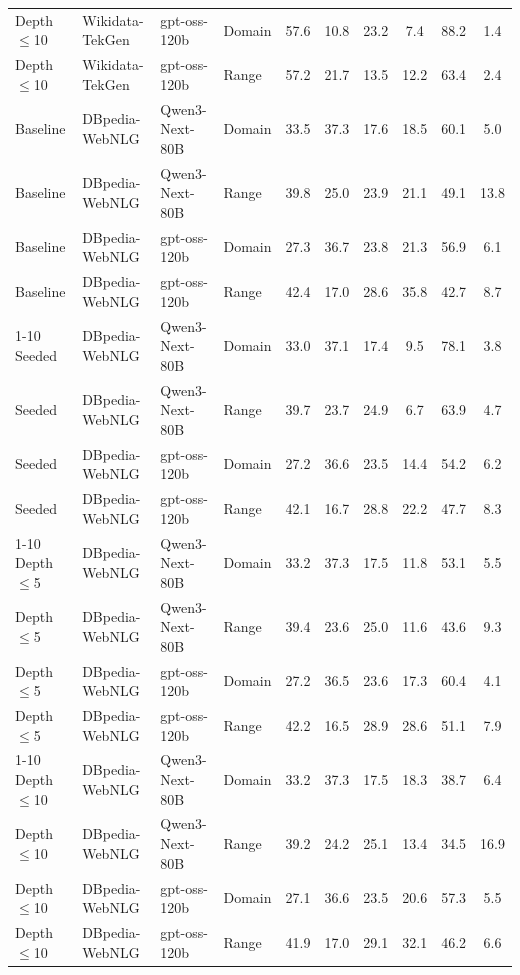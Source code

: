 \documentclass[11pt]{article}
\begin{document}
\begin{table}[t]
\begin{tabular}{llll ccc ccc}
Depth $\leq$10 & Wikidata-TekGen & gpt-oss-120b   & Domain & 57.6 & 10.8 & 23.2 & 7.4  & 88.2 & 1.4 \\
Depth $\leq$10 & Wikidata-TekGen & gpt-oss-120b   & Range  & 57.2 & 21.7 & 13.5 & 12.2 & 63.4 & 2.4 \\
\midrule
Baseline & DBpedia-WebNLG & Qwen3-Next-80B & Domain & 33.5 & 37.3 & 17.6 & 18.5 & 60.1 & 5.0 \\
Baseline & DBpedia-WebNLG & Qwen3-Next-80B & Range  & 39.8 & 25.0 & 23.9 & 21.1 & 49.1 & 13.8 \\
Baseline & DBpedia-WebNLG & gpt-oss-120b   & Domain & 27.3 & 36.7 & 23.8 & 21.3 & 56.9 & 6.1 \\
Baseline & DBpedia-WebNLG & gpt-oss-120b   & Range  & 42.4 & 17.0 & 28.6 & 35.8 & 42.7 & 8.7 \\
\cmidrule(lr){1-10}
Seeded & DBpedia-WebNLG & Qwen3-Next-80B & Domain & 33.0 & 37.1 & 17.4 & 9.5  & 78.1 & 3.8 \\
Seeded & DBpedia-WebNLG & Qwen3-Next-80B & Range  & 39.7 & 23.7 & 24.9 & 6.7  & 63.9 & 4.7 \\
Seeded & DBpedia-WebNLG & gpt-oss-120b   & Domain & 27.2 & 36.6 & 23.5 & 14.4 & 54.2 & 6.2 \\
Seeded & DBpedia-WebNLG & gpt-oss-120b   & Range  & 42.1 & 16.7 & 28.8 & 22.2 & 47.7 & 8.3 \\
\cmidrule(lr){1-10}
Depth $\leq$5 & DBpedia-WebNLG & Qwen3-Next-80B & Domain & 33.2 & 37.3 & 17.5 & 11.8 & 53.1 & 5.5 \\
Depth $\leq$5 & DBpedia-WebNLG & Qwen3-Next-80B & Range  & 39.4 & 23.6 & 25.0 & 11.6 & 43.6 & 9.3 \\
Depth $\leq$5 & DBpedia-WebNLG & gpt-oss-120b   & Domain & 27.2 & 36.5 & 23.6 & 17.3 & 60.4 & 4.1 \\
Depth $\leq$5 & DBpedia-WebNLG & gpt-oss-120b   & Range  & 42.2 & 16.5 & 28.9 & 28.6 & 51.1 & 7.9 \\
\cmidrule(lr){1-10}
Depth $\leq$10 & DBpedia-WebNLG & Qwen3-Next-80B & Domain & 33.2 & 37.3 & 17.5 & 18.3 & 38.7 & 6.4 \\
Depth $\leq$10 & DBpedia-WebNLG & Qwen3-Next-80B & Range  & 39.2 & 24.2 & 25.1 & 13.4 & 34.5 & 16.9 \\
Depth $\leq$10 & DBpedia-WebNLG & gpt-oss-120b   & Domain & 27.1 & 36.6 & 23.5 & 20.6 & 57.3 & 5.5 \\
Depth $\leq$10 & DBpedia-WebNLG & gpt-oss-120b   & Range  & 41.9 & 17.0 & 29.1 & 32.1 & 46.2 & 6.6 \\
\bottomrule
\end{tabular}

\end{table}
\end{document}
